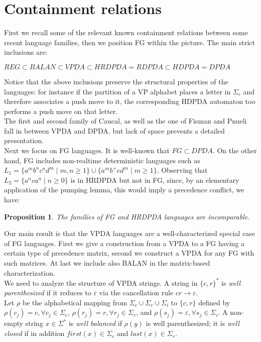 \documentclass[3p,11pt]{elsarticle}
\newtheorem{proposition}[theorem]{Proposition}
\begin{document}
\section{Containment relations}
First we recall some of the relevant known \cite{AluMad04,conf/mfcs/NowotkaS07,conf/csr/LimayeMM08,caucal:DSP:2008:1743} containment relations between some recent language families, then we position FG within the picture. The main  strict inclusions are:
\begin{center}
$ REG \subset BALAN \subset VPDA \subset  HRDPDA=RDPDA \subset  HDPDA = DPDA $
\end{center}
Notice that the above inclusions preserve the structural properties of the languages: for instance if the partition of a VP alphabet places a letter in $\Sigma_c$ and therefore associates a push move to it, the corresponding HDPDA automaton too performs a push move on that letter.
\\
The first \cite{conf/dlt/Caucal06} and second \cite{conf/csr/CaucalH08} family of Caucal, as well as the one of Fisman and Pnueli \cite{FisPnu01} fall in between VPDA and DPDA. but lack of space prevents a detailed presentation.
\\
\label{SectVPAareOPG} Next we focus on FG  languages. It is well-known that $FG \subset DPDA$. On the other hand, FG includes non-realtime deterministic languages such as $L_1=\{a^m b^n c^n d^m \mid m,n\ge 1\} \cup \{a^m b^+ e d^m \mid m\ge 1\}$. Observing that $L_2=\{a^n c a^n \mid n\geq 0\}$ is in HRDPDA but not in FG, since, by an elementary application of the pumping lemma, this would imply a precedence conflict, we have:
 \begin{proposition}
 The families of FG and HRDPDA languages are incomparable.
 \end{proposition}
 Our main result is that the VPDA languages are a well-characterized special case of
 FG languages. First we give a construction from a VPDA to a FG having a
 certain type of precedence matrix, second we construct a VPDA for any FG with such matrices.
At last we include also BALAN in the matrix-based characterization.
\\
 We need to analyze the structure of  VPDA strings.
 A string in $\{c,r\}^{\ast}$ is \emph{well parenthesized} if it reduces to $\varepsilon$ via the cancellation rule $cr\to \varepsilon$.
\\
Let $\rho$ be the alphabetical mapping from $\Sigma_c \cup \Sigma_r\cup \Sigma_i $ to $\{c,r\}$ defined by $\rho(c_j)=c, \forall c_j\in \Sigma_c$, $\rho(r_j)=r, \forall r_j\in \Sigma_r$, and $\rho(s_j)=\varepsilon, \forall s_j\in \Sigma_i$. A non-empty string $x \in \Sigma^{\ast}$ is \emph{well balanced} if  $\rho(y)$ is well parenthesized; it is \emph{well closed} if in addition $first(x)\in \Sigma_c$ and $last(x)\in \Sigma_r$.
\end{document}
